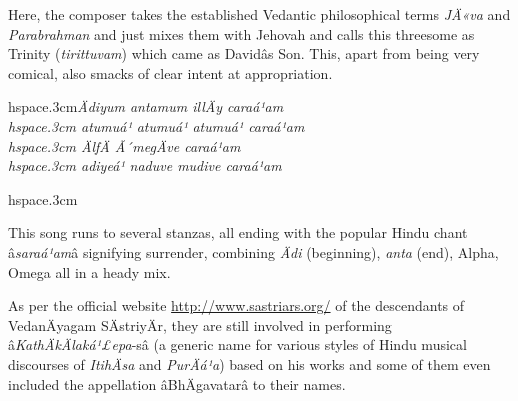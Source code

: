\begin{myquote}
\end{myquote}

Here, the composer takes the established Vedantic philosophical terms \textit{JÄ«va} and \textit{Parabrahman} and just mixes them with Jehovah and calls this threesome as Trinity (\textit{tirittuvam}) which came as Davidâs Son. This, apart from being very comical, also smacks of clear intent at appropriation.

\begin{myquote}
hspace{.3cm}\textit{Ädiyum antamum illÄy caraá¹am\\hspace{.3cm} atumuá¹ atumuá¹ atumuá¹ caraá¹am\\hspace{.3cm} ÄlfÄ Ã´megÄve caraá¹am\\hspace{.3cm} adiyeá¹ naduve mudive caraá¹am}
\end{myquote}

\begin{myquote}
hspace{.3cm}
\end{myquote}

This song runs to several stanzas, all ending with the popular Hindu chant â\textit{saraá¹am}â signifying surrender, combining \textit{Ädi} (beginning), \textit{anta} (end), Alpha, Omega all in a heady mix.

As per the official website \url{http://www.sastriars.org/} of the descendants of VedanÄyagam SÄstriyÄr, they are still involved in performing â\textit{KathÄkÄlaká¹£epa}-sâ (a generic name for various styles of Hindu musical discourses of \textit{ItihÄsa} and \textit{PurÄá¹a}) based on his works and some of them even included the appellation âBhÄgavatarâ to their names.


